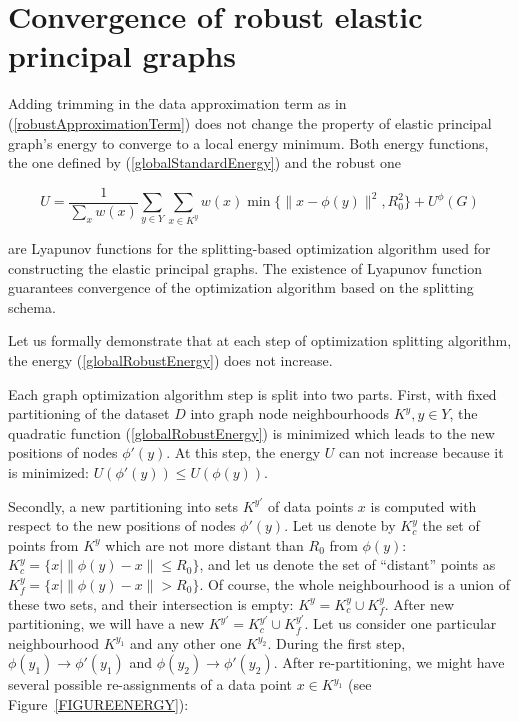 \documentclass[graybox]{archivesofdatascience}
\begin{document}
\fi






\section{Convergence of robust elastic principal graphs}

Adding trimming in the data approximation term as in (\ref{robustApproximationTerm}) does not change the property of elastic principal graph's energy to converge to a local energy minimum. Both energy functions, the one defined by (\ref{globalStandardEnergy}) and the robust one

\begin{equation}\label{globalRobustEnergy}
U = \frac{1}{\sum_{x} w(x)}\sum_{y \in Y} \sum_{x \in K^y} w(x) \min \{\|x-
\phi(y)\|^2,R_0^2\}+U^{\phi}{(G)}
\end{equation}

\noindent are Lyapunov functions for the splitting-based optimization algorithm used for constructing the elastic principal graphs. The existence of Lyapunov function guarantees convergence of the optimization algorithm based on the splitting schema.

Let us formally demonstrate that at each step of optimization splitting algorithm, the energy (\ref{globalRobustEnergy}) does not increase.

Each graph optimization algorithm step is split into two parts. First, with fixed partitioning of the dataset $D$ into graph node neighbourhoods $K^y,y\in Y$, the quadratic function (\ref{globalRobustEnergy}) is minimized which leads to the new positions of nodes $\phi'(y)$. At this step, the energy $U$ can not increase because it is minimized: $U(\phi'(y))\leq U(\phi(y))$.

Secondly, a new partitioning into sets $K^{y'}$ of data points $x$ is computed with respect to the new positions of nodes $\phi'(y)$. Let us denote by $K^y_c$ the set of points from $K^y$ which are not more distant than $R_0$ from $\phi(y)$: $K^y_c = \{x|\|\phi(y)-x\|\leq R_0\}$, and let us denote the set of ``distant'' points as $K^y_f = \{x|\|\phi(y)-x\|> R_0\}$. Of course, the whole neighbourhood is a union of these two sets, and their intersection is empty: $K^y = K^y_c\cup K^y_f$. After new partitioning, we will have a new $K^{y'} = K^{y'}_c\cup K^{y'}_f$. Let us consider one particular neighbourhood $K^{y_1}$ and any other one $K^{y_2}$. During the first step, $\phi(y_1)\rightarrow \phi'(y_1)$ and $\phi(y_2)\rightarrow \phi'(y_2)$. After re-partitioning, we might have several possible re-assignments of a data point $x\in K^{y_1}$  (see Figure~\ref{FIGUREENERGY}):
\end{document}
